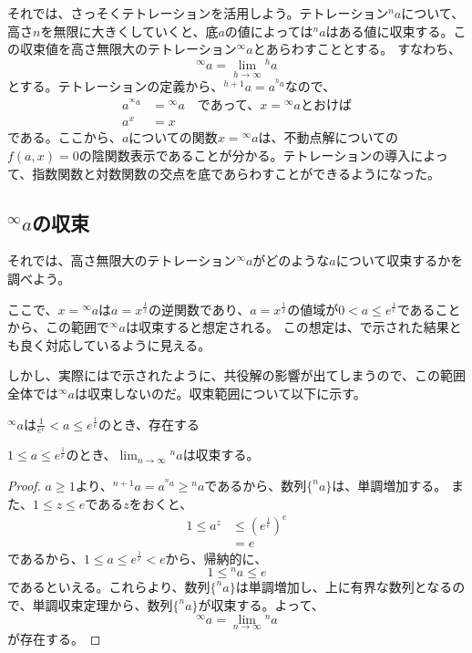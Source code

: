 	それでは、さっそくテトレーションを活用しよう。テトレーション$^n a$について、高さ$n$を無限に大きくしていくと、底$a$の値によっては$^n a$はある値に収束する。この収束値を高さ無限大のテトレーション$^\infty a$とあらわすこととする。
	すなわち、
	\begin{equation*}
		^\infty a = \lim_{h \to \infty} {^h a}
	\end{equation*}
	とする。テトレーションの定義から、$^{h+1} a = a^{^h a}$なので、
	\begin{align*}
		a ^{^\infty a} &= {^\infty a} \quad \text{であって、$x = {^\infty a}$とおけば} \\
		a^x &= x
	\end{align*}
	である。ここから、$a$についての関数$x = {^\infty a}$は、不動点解についての$f(a,x) = 0$の陰関数表示であることが分かる。テトレーションの導入によって、指数関数と対数関数の交点を底であらわすことができるようになった。
	
\subsection{$^\infty a$の収束}
	それでは、高さ無限大のテトレーション$^\infty a$がどのような$a$について収束するかを調べよう。
	
	ここで、$x = {^\infty a}$は$a = x^\frac{1}{x}$の逆関数であり、$a = x^\frac{1}{x}$の値域が$0 < a \leq e^\frac{1}{e}$であることから、この範囲で$^\infty a$は収束すると想定される。
	この想定は、で示された結果とも良く対応しているように見える。
	
	しかし、実際にはで示されたように、共役解の影響が出てしまうので、この範囲全体では$^\infty a$は収束しないのだ。収束範囲について以下に示す。
	\begin{theorem}
	\label{th:tetration_convergence}
		$^\infty a$は$\frac{1}{e^e} < a \leq e^\frac{1}{e}$のとき、存在する
	\end{theorem}
	
	\begin{lemma}
		$1 \leq a \leq e^\frac{1}{e}$のとき、$\lim_{n \to \infty} {^n a}$は収束する。
	\end{lemma}
	\begin{proof}
	
		$a \geq 1$より、$^{n+1} a = a ^{^n a} \geq {^n a}$であるから、数列$\{^n a\}$は、単調増加する。
		また、$1 \leq z \leq e$である$z$をおくと、
		\begin{align*}
			1 \leq a^z &\leq (e^\frac{1}{e})^e \\
					 &= e
		\end{align*}
		であるから、$1 \leq a \leq e^\frac{1}{e} < e$から、帰納的に、
		\begin{equation*}
			1 \leq {^n a} \leq e
		\end{equation*}
		であるといえる。これらより、数列$\{^n a\}$は単調増加し、上に有界な数列となるので、単調収束定理から、数列$\{^n a\}$が収束する。よって、
		\begin{equation*}
			^\infty a = \lim_{n \to \infty} {^n a}
		\end{equation*}
		が存在する。
	\end{proof}
	
